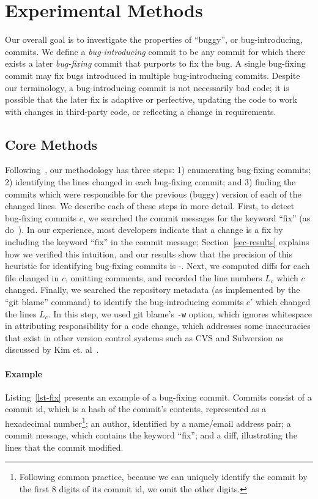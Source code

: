 \section{Experimental Methods}
\label{sec:method}
Our overall goal is to investigate the properties of ``buggy'', or
bug-introducing, commits. We define a \emph{bug-introducing} commit to
be any commit for which there exists a later \emph{bug-fixing} commit
that purports to fix the bug. A single bug-fixing commit may fix bugs
introduced in multiple bug-introducing commits. Despite our
terminology, a bug-introducing commit is not necessarily bad code; it
is possible that the later fix is adaptive or perfective, updating the
code to work with changes in third-party code, or reflecting a change
in requirements.

\subsection{Core Methods}
Following~\cite{sliwerski-msr-2005}, our methodology has three steps: 1) enumerating bug-fixing commits; 2)
identifying the lines changed in each bug-fixing commit; and 3)
finding the commits which were responsible for the previous (buggy)
version of each of the changed lines. We describe each of these steps
in more detail. First, to detect bug-fixing commits $c$, we searched
the commit messages for the keyword ``fix'' (as do~\cite{smallCommits05}). 
In our experience, most developers indicate that a change is a fix by including the keyword
``fix'' in the commit message; Section~\ref{sec-results} explains how
we verified this intuition, and our results show that the precision
of this heuristic for identifying bug-fixing commits is \postP-\linuxP. 
Next, we computed diffs for each file
changed in $c$, omitting comments, and recorded the line numbers $L_c$ which $c$
changed. Finally, we searched the repository %
metadata (as implemented by the ``git blame'' command) to identify the
bug-introducing commits $c'$ which changed the lines $L_c$. In this
step, we used git blame's {\tt -w} option, which ignores whitespace in
attributing responsibility for a code change, which addresses some
inaccuracies that exist in other version control systems such as CVS
and Subversion as discussed by Kim et. al~\cite{2006-automatic}.

\paragraph{Example} Listing~\ref{lst-fix} presents an example of a
bug-fixing commit. Commits consist of a commit id, which is a hash
of the commit's contents, represented as a hexadecimal number\footnote{Following common practice, because we can uniquely identify the commit by the first 8 digits of its commit id, we omit the other digits.}; an
author, identified by a name/email address pair; a commit message,
which contains the keyword ``fix''; and a diff, illustrating the lines
that the commit modified. 

